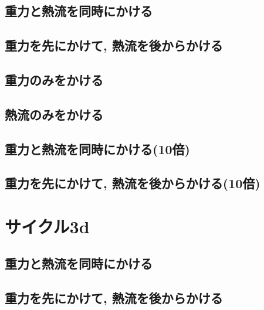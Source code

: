 \subsection{重力と熱流を同時にかける}



\subsection{重力を先にかけて, 熱流を後からかける}



\subsection{重力のみをかける}



\subsection{熱流のみをかける}



\subsection{重力と熱流を同時にかける(10倍)}



\subsection{重力を先にかけて, 熱流を後からかける(10倍)}



\section{サイクル3d}

\subsection{重力と熱流を同時にかける}



\subsection{重力を先にかけて, 熱流を後からかける}

